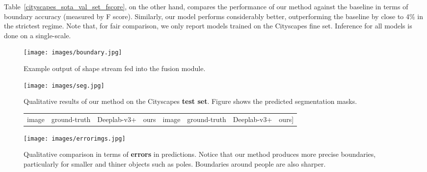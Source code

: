 \documentclass[10pt,twocolumn,letterpaper]{article}
\begin{document}
Table~\ref{cityscapes_sota_val_set_fscore}, on the other hand, compares the performance of our method against the baseline in terms of boundary accuracy (measured by F score). 
Similarly, our model performs considerably better, outperforming the baseline by close to 4\% in the strictest regime. 
Note that, for fair comparison, we only report models trained on the Cityscapes fine set. Inference for all models is done on a single-scale.
  
  
  \begin{figure}[t!]
\vspace{-2mm}
\centering
\texttt{[image: images/boundary.jpg]}
\vspace{-7mm}
\caption{Example output of shape stream fed into the fusion module.
}
\label{fig:boundary}
\vspace{-2mm}
\end{figure}

\begin{figure*}[t!]
 
\centering
\texttt{[image: images/seg.jpg]} 
\vspace{-6.5mm}
\caption{Qualitative results of our method on the Cityscapes {\bf test set}. Figure shows the predicted segmentation masks.}
\label{fig:testset}
\end{figure*}

\begin{figure*}[t!]
  \vspace{-1mm}
 \centering
 \begin{footnotesize}
 \begin{tabular}{C{1.6cm}C{1.7cm}C{1.7cm}C{1.8cm}C{2cm}C{1.7cm}C{1.7cm}C{1.7cm}}
 image & ground-truth & Deeplab-v3+ & ours &  image & ground-truth & Deeplab-v3+ & ours\-1mm]
 \end{tabular}
  \end{footnotesize}
 \texttt{[image: images/errorimgs.jpg]} 
   \vspace{-8mm}
 \caption{Qualitative comparison in terms of {\bf errors} in predictions. Notice that our method produces more precise boundaries, particularly for smaller and thiner objects such as poles. Boundaries around people are also sharper.}
 \label{fig:errors_qualitative}
  \vspace{-1mm}
\end{figure*}
\end{document}
